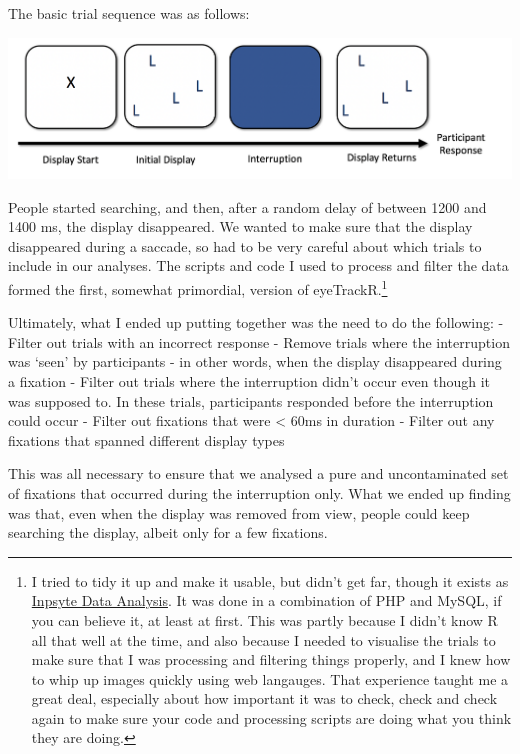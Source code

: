 \documentclass[]{book}
\let\rmarkdownfootnote\footnote%
\def\footnote{\protect\rmarkdownfootnote}
\begin{document}
The basic trial sequence was as follows:

\includegraphics[width=22.89in]{files/images/displayInterruption}

People started searching, and then, after a random delay of between 1200 and 1400 ms, the display disappeared. We wanted to make sure that the display disappeared during a saccade, so had to be very careful about which trials to include in our analyses. The scripts and code I used to process and filter the data formed the first, somewhat primordial, version of eyeTrackR.\footnote{I tried to tidy it up and make it usable, but didn't get far, though it exists as \href{https://github.com/hjgodwin/Inpsyte-Data-Analysis}{Inpsyte Data Analysis}. It was done in a combination of PHP and MySQL, if you can believe it, at least at first. This was partly because I didn't know R all that well at the time, and also because I needed to visualise the trials to make sure that I was processing and filtering things properly, and I knew how to whip up images quickly using web langauges. That experience taught me a great deal, especially about how important it was to check, check and check again to make sure your code and processing scripts are doing what you think they are doing.}

Ultimately, what I ended up putting together was the need to do the following:
- Filter out trials with an incorrect response
- Remove trials where the interruption was `seen' by participants - in other words, when the display disappeared during a fixation
- Filter out trials where the interruption didn't occur even though it was supposed to. In these trials, participants responded before the interruption could occur
- Filter out fixations that were \textless{} 60ms in duration
- Filter out any fixations that spanned different display types

This was all necessary to ensure that we analysed a pure and uncontaminated set of fixations that occurred during the interruption only. What we ended up finding was that, even when the display was removed from view, people could keep searching the display, albeit only for a few fixations.
\end{document}
